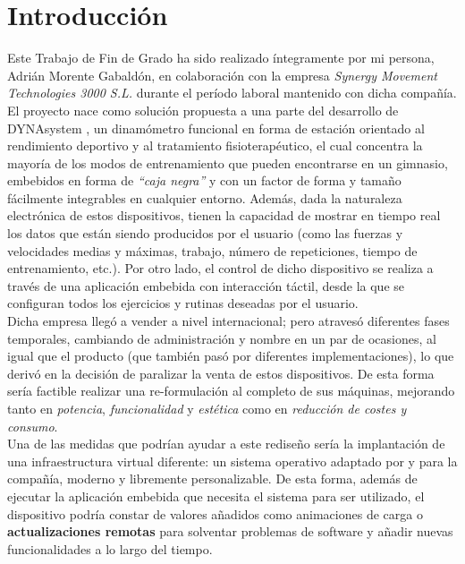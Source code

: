 \chapter{Introducción}

Este Trabajo de Fin de Grado ha sido realizado íntegramente por mi persona, Adrián Morente Gabaldón, en colaboración con la empresa \textit{Synergy Movement Technologies 3000 S.L.} durante el período laboral mantenido con dicha compañía. El proyecto nace como solución propuesta a una parte del desarrollo de DYNAsystem \cite{dynasystem-web}, un dinamómetro funcional en forma de estación orientado al rendimiento deportivo y al tratamiento fisioterapéutico, el cual concentra la mayoría de los modos de entrenamiento que pueden encontrarse en un gimnasio, embebidos en forma de \textit{``caja negra''} y con un factor de forma y tamaño fácilmente integrables en cualquier entorno. Además, dada la naturaleza electrónica de estos dispositivos, tienen la capacidad de mostrar en tiempo real los datos que están siendo producidos por el usuario (como las fuerzas y velocidades medias y máximas, trabajo, número de repeticiones, tiempo de entrenamiento, etc.). Por otro lado, el control de dicho dispositivo se realiza a través de una aplicación embebida con interacción táctil, desde la que se configuran todos los ejercicios y rutinas deseadas por el usuario.\\

Dicha empresa llegó a vender a nivel internacional; pero atravesó diferentes fases temporales, cambiando de administración y nombre en un par de ocasiones, al igual que el producto (que también pasó por diferentes implementaciones), lo que derivó en la decisión de paralizar la venta de estos dispositivos. De esta forma sería factible realizar una re-formulación al completo de sus máquinas, mejorando tanto en \textit{potencia}, \textit{funcionalidad} y \textit{estética} como en \textit{reducción de costes y consumo}.\\

Una de las medidas que podrían ayudar a este rediseño sería la implantación de una infraestructura virtual diferente: un sistema operativo adaptado por y para la compañía, moderno y libremente personalizable. De esta forma, además de ejecutar la aplicación embebida que necesita el sistema para ser utilizado, el dispositivo podría constar de valores añadidos como animaciones de carga o \textbf{actualizaciones remotas} para solventar problemas de software y añadir nuevas funcionalidades a lo largo del tiempo.\\

